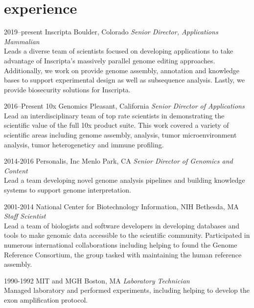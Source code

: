 \documentclass[]{dmc-cv} %
\begin{document}
\section{experience}

\begin{entrylist}


\entry
{2019--present}
{Inscripta}
{Boulder, Colorado}
{\emph{Senior Director, Applications Mammalian} \\
Leads a diverse team of scientists focused on developing applications to take advantage of Inscripta's massively parallel genome editing approaches. Additionally, we work on provide genome assembly, annotation and knowledge bases to support experimental design as well as subsequence analysis. Lastly, we provide biosecurity solutions for Inscripta.
}

\entry
{2016--Present}
{10x Genomics}
{Pleasant, California}
{\emph{Senior Director of Applications} \\
Lead an interdisciplinary team of top rate scientists in demonstrating the scientific value of the full 10x product suite. This work covered a variety of scientific areas including genome assembly, analysis, tumor microenvironment analysis, tumor heterogeneticy and immune profiling.
}

\entry
{2014-2016}
{Personalis, Inc}
{Menlo Park, CA}
{\emph{Senior Director of Genomics and Content} \\
Lead a team developing novel genome analysis pipelines and building knowledge systems to support genome interpretation.
}

\entry
{2001-2014}
{National Center for Biotechnology Information, NIH}
{Bethesda, MA}
{\emph{Staff Scientist} \\
Lead a team of biologists and software developers in developing databases and tools to make genomic data accessible to the scientific community. Participated in numerous international collaborations including helping to found the Genome Reference Consortium, the group tasked with maintaining the human reference assembly.
}

\entry
{1990-1992}
{MIT and MGH}
{Boston, MA}
{\emph{Laboratory Technician}\\
Managed laboratory and performed experiments, including helping to develop the exon amplification protocol.
}

\end{entrylist}
\end{document}

